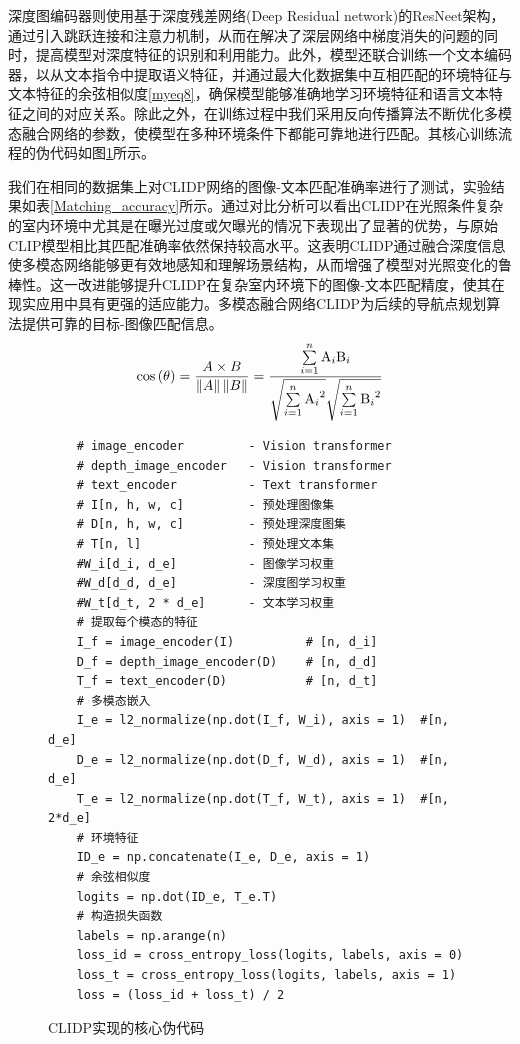 深度图编码器则使用基于深度残差网络(Deep Residual network)的ResNeet架构，通过引入跳跃连接和注意力机制，从而在解决了深层网络中梯度消失的问题的同时，提高模型对深度特征的识别和利用能力。此外，模型还联合训练一个文本编码器，以从文本指令中提取语义特征，并通过最大化数据集中互相匹配的环境特征与文本特征的余弦相似度\eqref{myeq8}，确保模型能够准确地学习环境特征和语言文本特征之间的对应关系。除此之外，在训练过程中我们采用反向传播算法不断优化多模态融合网络的参数，使模型在多种环境条件下都能可靠地进行匹配。其核心训练流程的伪代码如图\ref{CLIDP_CODE}所示。


我们在相同的数据集上对CLIDP网络的图像-文本匹配准确率进行了测试，实验结果如表\ref{Matching_accuracy}所示。通过对比分析可以看出CLIDP在光照条件复杂的室内环境中尤其是在曝光过度或欠曝光的情况下表现出了显著的优势，与原始CLIP模型相比其匹配准确率依然保持较高水平。这表明CLIDP通过融合深度信息使多模态网络能够更有效地感知和理解场景结构，从而增强了模型对光照变化的鲁棒性。这一改进能够提升CLIDP在复杂室内环境下的图像-文本匹配精度，使其在现实应用中具有更强的适应能力。多模态融合网络CLIDP为后续的导航点规划算法提供可靠的目标-图像匹配信息。
\begin{equation}
    \cos \left( \theta  \right) = \frac{{A \times B}}{{\left\| A \right\|\left\| B \right\|}} = \frac{{\sum\limits_{i = 1}^n {{{\rm A}_i}{{\rm B}_i}} }}{{\sqrt {\sum\limits_{i = 1}^n {{{\rm A}_i}^2} } \sqrt {\sum\limits_{i = 1}^n {{{\rm B}_i}^2} } }}
        \label{myeq8}
    \end{equation}

\begin{figure}[H]
    \begin{lstlisting} 
    # image_encoder	        - Vision transformer
    # depth_image_encoder	- Vision transformer
    # text_encoder	        - Text transformer
    # I[n, h, w, c]	        - 预处理图像集
    # D[n, h, w, c]	        - 预处理深度图集
    # T[n, l]	            - 预处理文本集
    #W_i[d_i, d_e]	        - 图像学习权重
    #W_d[d_d, d_e]	        - 深度图学习权重
    #W_t[d_t, 2 * d_e]	    - 文本学习权重
    # 提取每个模态的特征
    I_f = image_encoder(I)	        # [n, d_i]
    D_f = depth_image_encoder(D)	# [n, d_d]
    T_f = text_encoder(D)	        # [n, d_t]
    # 多模态嵌入
    I_e = l2_normalize(np.dot(I_f, W_i), axis = 1)	#[n, d_e]
    D_e = l2_normalize(np.dot(D_f, W_d), axis = 1)	#[n, d_e]
    T_e = l2_normalize(np.dot(T_f, W_t), axis = 1)	#[n, 2*d_e]
    # 环境特征
    ID_e = np.concatenate(I_e, D_e, axis = 1)
    # 余弦相似度
    logits = np.dot(ID_e, T_e.T)
    # 构造损失函数
    labels = np.arange(n)
    loss_id = cross_entropy_loss(logits, labels, axis = 0)
    loss_t = cross_entropy_loss(logits, labels, axis = 1)
    loss = (loss_id + loss_t) / 2
    \end{lstlisting}
    \caption{CLIDP实现的核心伪代码}
    \label{CLIDP_CODE}
    \end{figure}
    



